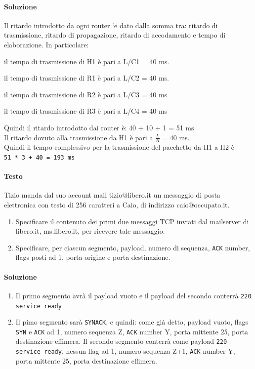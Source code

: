 \documentclass[10pt]{article}
\begin{document}
{\paragraph{Soluzione} Il ritardo introdotto da ogni router `e dato dalla somma
tra: ritardo di trasmissione, ritardo di propagazione, ritardo di
accodamento e tempo di elaborazione. In particolare:
\begin{list}{-}{}
\item il tempo di trasmissione di H1 è pari a L/C1 = 40 ms.
\item il tempo di trasmissione di R1 è pari a L/C2 = 40 ms.
\item il tempo di trasmissione di R2 è pari a L/C3 = 40 ms
\item il tempo di trasmissione di R3 è pari a L/C4 = 40 ms
\end{list}
Quindi il ritardo introdotto dai router è: 40 + 10 + 1 = 51 ms\\
Il ritardo dovuto alla trasmissione da H1 è pari a $\frac{L}{R}$ = 40 ms.\\
Quindi il tempo complessivo per la trasmissione del pacchetto da H1 a H2 è\\
\texttt{51 * 3 + 40 = 193 ms}
\pagebreak
\paragraph{Testo} Tizio manda dal suo account mail tizio@libero.it un messaggio di posta elettronica con testo di 256 caratteri a Caio, di indirizzo caio@occupato.it.
\begin{enumerate}
\item  Specificare il contenuto dei primi due messaggi TCP inviati dal mailserver di libero.it, ms.libero.it, per ricevere tale messaggio.
\item Specificare, per ciascun segmento, payload, numero di sequenza, \texttt{ACK} number, flags posti ad 1, porta origine e porta destinazione.
\end{enumerate}
\paragraph{Soluzione}
\begin{enumerate}
\item Il primo segmento avrà il payload vuoto e il payload del secondo conterrà \texttt{220 service ready}
\item Il pimo segmento sarà \texttt{SYNACK}, e quindi: come già detto, payload vuoto, flags \texttt{SYN} e \texttt{ACK} ad 1, numero sequenza Z, \texttt{ACK} number Y, porta mittente 25, porta destinazione effimera. Il secondo segmento conterrà come payload \texttt{220 service ready}, nessun flag ad 1, numero sequenza Z+1, \texttt{ACK} number Y, porta mittente 25, porta destinazione effimera.
\end{enumerate}
}
\end{document}
